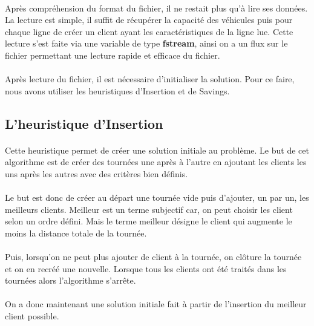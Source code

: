 \documentclass[12pt]{article}
\begin{document}
\paragraph{}
Après compréhension du format du fichier, il ne restait plus qu'à lire ses données. La lecture est simple, il suffit de récupérer la capacité 
des véhicules puis pour chaque ligne de créer un client ayant les caractéristiques de la ligne lue. Cette lecture s'est faite via une variable de
type \textbf{fstream}, ainsi on a un flux sur le fichier permettant une lecture rapide et efficace du fichier.

\paragraph{}
Après lecture du fichier, il est nécessaire d'initialiser la solution. Pour ce faire, nous avons utiliser les heuristiques d'Insertion et de Savings.

\subsection{L'heuristique d'Insertion}

\paragraph{}
Cette heuristique permet de créer une solution initiale au problème. Le but de cet algorithme est de créer des tournées une après à l'autre en 
ajoutant les clients les uns après les autres avec des critères bien définis.

\paragraph{}
Le but est donc de créer au départ une tournée vide puis d'ajouter, un par un, les meilleurs clients. Meilleur est un terme subjectif car, on peut choisir les 
client selon un ordre défini. Mais le terme meilleur désigne le client qui augmente le moins la distance totale de la tournée.

\paragraph{}
Puis, lorsqu'on ne peut plus ajouter de client à la tournée, on clôture la tournée et on en recréé une nouvelle. Lorsque tous les clients ont été traités 
dans les tournées alors l'algorithme s'arrête.

\paragraph{}
On a donc maintenant une solution initiale fait à partir de l'insertion du meilleur client possible. 
\end{document}
